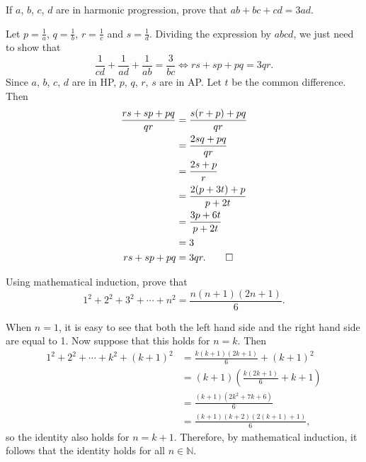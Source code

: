 \begin{question}
    If $a$, $b$, $c$, $d$ are in harmonic progression, prove that $ab + bc + cd
    = 3ad$.
\end{question}
\begin{solution}
    Let $p = \frac{1}{a}$, $q = \frac{1}{b}$, $r = \frac{1}{c}$ and $s =
    \frac{1}{d}$. Dividing the expression by $abcd$, we just need to show that
    \[\frac{1}{cd} + \frac{1}{ad} + \frac{1}{ab} = \frac{3}{bc}
    \Longleftrightarrow rs + sp + pq = 3qr.\]
    Since $a$, $b$, $c$, $d$ are in HP, $p$, $q$, $r$, $s$ are in AP. Let $t$
    be the common difference. Then
    \begin{align*}
        \frac{rs + sp + pq}{qr} &= \frac{s(r + p) + pq}{qr}\\
        &= \frac{2sq + pq}{qr}\\
        &= \frac{2s + p}{r}\\
        &= \frac{2(p + 3t) + p}{p + 2t}\\
        &= \frac{3p + 6t}{p + 2t}\\
        &= 3\\
        rs + sp + pq &= 3qr. \qedhere
    \end{align*}
\end{solution}

\begin{question}
    Using mathematical induction, prove that 
    \[1^2 + 2^2 + 3^2 + \cdots + n^2 = \frac{n(n + 1)(2n + 1)}{6}.\]
\end{question}
\begin{solution}
    When $n = 1$, it is easy to see that both the left hand side and the right
    hand side are equal to 1. Now suppose that this holds for $n = k$. Then
    \begin{align*}
        1^2 + 2^2 + \cdots + k^2 + (k + 1)^2 &= \frac{k(k + 1)(2k + 1)}{6} + (k + 1)^2\\
        &= (k + 1)\left( \frac{k(2k + 1)}{6} + k + 1 \right)\\
        &= \frac{(k + 1)(2k^2 + 7k + 6)}{6}\\
        &= \frac{(k + 1)(k + 2)(2(k + 1) + 1)}{6},
    \end{align*}
    so the identity also holds for $n = k + 1$. Therefore, by mathematical
    induction, it follows that the identity holds for all $n \in \mathbb{N}$.
\end{solution}

